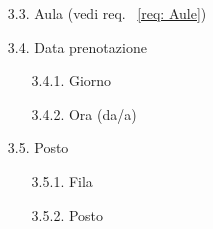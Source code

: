 \begin{enumerate}
\begin{enumerate}
			\item[3.3.] Aula (vedi req. ~\ref{req: Aule})
			\item[3.4.] Data prenotazione
							\begin{enumerate}
							\item[3.4.1.] Giorno
							\item[3.4.2.] Ora (da/a)
							\end{enumerate}			
			\item[3.5.] Posto 
							\begin{enumerate}
							\item[3.5.1.] Fila
							\item[3.5.2.] Posto
							\end{enumerate}
				\end{enumerate}
\end{enumerate}



